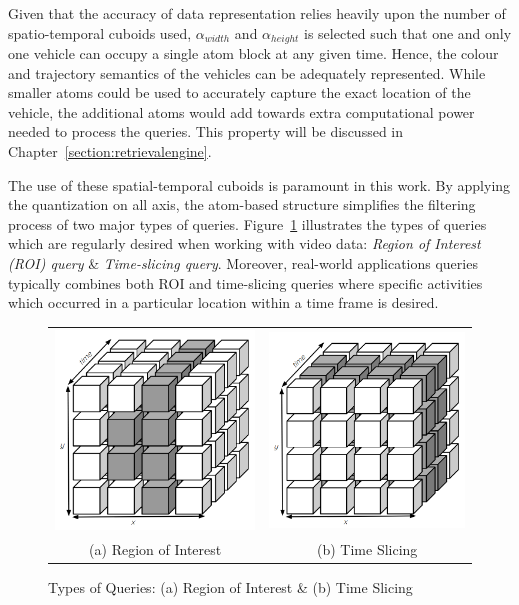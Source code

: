 Given that the accuracy of data representation relies heavily upon the number of spatio-temporal cuboids used, $\alpha_{width}$ and $\alpha_{height}$ is selected such that one and only one vehicle can occupy a single atom block at any given time. Hence, the colour and trajectory semantics of the vehicles can be adequately represented.
While smaller atoms could be used to accurately capture the exact location of the vehicle, the additional atoms would add towards extra computational power needed to process the queries. This property will be discussed in Chapter~\ref{section:retrievalengine}.

The use of these spatial-temporal cuboids is paramount in this work.
By applying the quantization on all axis, the atom-based structure simplifies the filtering process of two major types of queries.
Figure~\ref{fig:typesofQuery} illustrates the types of queries which are regularly desired when working with video data: \textit{Region of Interest (ROI) query} \& \textit{Time-slicing query}.
Moreover, real-world applications queries typically combines both ROI and time-slicing queries where specific activities which occurred in a particular location within a time frame is desired.


\begin{figure}[htb!]
  \centering
  \begin{tabular}{cc}
  \includegraphics[width=0.3\linewidth]{image/general/atom_ROI.PNG} &
  \includegraphics[width=0.3\linewidth]{image/general/atom_time_slicing.PNG}\\
  (a) Region of Interest & (b) Time Slicing
  \end{tabular}
  \caption{Types of Queries: (a) Region of Interest \& (b) Time Slicing}
  \label{fig:typesofQuery}
\end{figure}



